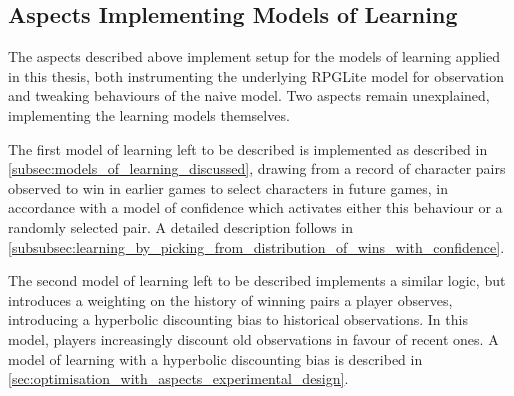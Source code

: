\subsection{Aspects Implementing Models of Learning}\label{subsec:aspects_modelling_learning}



The aspects described above implement setup for the models of learning applied
in this thesis, both instrumenting the underlying RPGLite model for observation
and tweaking behaviours of the naive model. Two aspects remain unexplained,
implementing the learning models themselves.

The first model of learning left to be described is implemented as described in
\cref{subsec:models_of_learning_discussed}, drawing from a record of character
pairs observed to win in earlier games to select characters in future games, in
accordance with a model of confidence which activates either this behaviour or a
randomly selected pair. A detailed description follows in
\cref{subsubsec:learning_by_picking_from_distribution_of_wins_with_confidence}.

The second model of learning left to be described implements a similar logic,
but introduces a weighting on the history of winning pairs a player observes,
introducing a hyperbolic discounting bias to historical observations. In this
model, players increasingly discount old observations in favour of recent ones.
A model of learning with a hyperbolic discounting bias is described in
\cref{sec:optimisation_with_aspects_experimental_design}.


